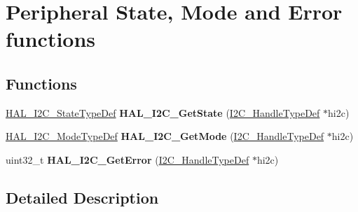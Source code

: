 \hypertarget{group___i2_c___exported___functions___group3}{}\section{Peripheral State, Mode and Error functions}
\label{group___i2_c___exported___functions___group3}
\subsection*{Functions}
\begin{DoxyCompactItemize}
\item 
\mbox{\label{group___i2_c___exported___functions___group3_gad63373b093502b83d5f9bd5e292385f0}} 
\hyperlink{group___h_a_l__state__structure__definition_gaef355af8eab251ae2a19ee164ad81c37}{H\+A\+L\+\_\+\+I2\+C\+\_\+\+State\+Type\+Def} {\bfseries H\+A\+L\+\_\+\+I2\+C\+\_\+\+Get\+State} (\hyperlink{struct_____i2_c___handle_type_def}{I2\+C\+\_\+\+Handle\+Type\+Def} $\ast$hi2c)
\item 
\mbox{\label{group___i2_c___exported___functions___group3_ga12d8407ccfb92f50caa5189b05a13351}} 
\hyperlink{group___h_a_l__mode__structure__definition_gabcbb7b844f2ffd63c4e530c117882062}{H\+A\+L\+\_\+\+I2\+C\+\_\+\+Mode\+Type\+Def} {\bfseries H\+A\+L\+\_\+\+I2\+C\+\_\+\+Get\+Mode} (\hyperlink{struct_____i2_c___handle_type_def}{I2\+C\+\_\+\+Handle\+Type\+Def} $\ast$hi2c)
\item 
\mbox{\label{group___i2_c___exported___functions___group3_ga5db5fcfa0c3fd3e45e176d000738f7bc}} 
uint32\+\_\+t {\bfseries H\+A\+L\+\_\+\+I2\+C\+\_\+\+Get\+Error} (\hyperlink{struct_____i2_c___handle_type_def}{I2\+C\+\_\+\+Handle\+Type\+Def} $\ast$hi2c)
\end{DoxyCompactItemize}


\subsection{Detailed Description}
